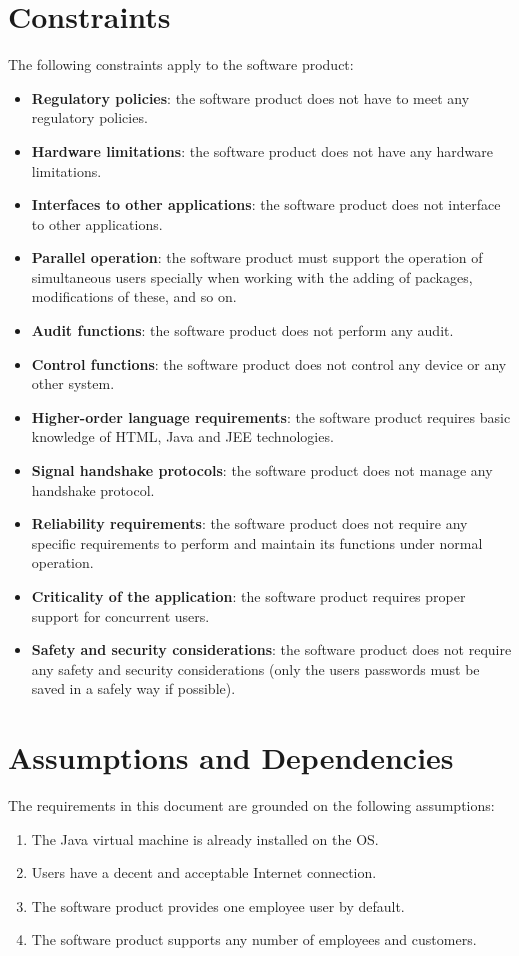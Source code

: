 \documentclass[a4paper,12pt]{book}
\begin{document}
\section{Constraints}
The following constraints apply to the software product:
\begin{itemize}
  \item \textbf{Regulatory policies}: the software product does not have to meet any regulatory policies.
  \item \textbf{Hardware limitations}: the software product does not have any hardware limitations.
  \item \textbf{Interfaces to other applications}: the software product does not interface to other applications.
  \item \textbf{Parallel operation}: the software product must support the operation of simultaneous users specially when working with the adding of packages, modifications of these, and so on.
  \item \textbf{Audit functions}: the software product does not perform any audit.
  \item \textbf{Control functions}: the software product does not control any device or any other system.
  \item \textbf{Higher-order language requirements}: the software product requires basic knowledge of HTML, Java and JEE technologies.
  \item \textbf{Signal handshake protocols}: the software product does not manage any handshake protocol.
  \item \textbf{Reliability requirements}: the software product does not require any specific requirements to perform and maintain its functions under normal operation.
  \item \textbf{Criticality of the application}: the software product requires proper support for concurrent users.
  \item \textbf{Safety and security considerations}: the software product does not require any safety and security considerations (only the users passwords must be saved in a safely way if possible).
\end{itemize}

\section{Assumptions and Dependencies}
The requirements in this document are grounded on the following assumptions:
\begin{enumerate}[noitemsep]
  \item The Java virtual machine is already installed on the OS.
  \item Users have a decent and acceptable Internet connection.
  \item The software product provides one employee user by default.
  \item The software product supports any number of employees and customers.
\end{enumerate}
\end{document}
